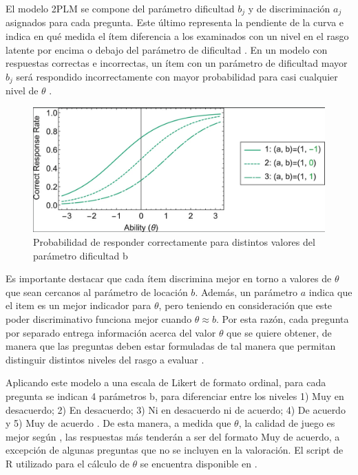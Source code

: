 El modelo 2PLM se compone del parámetro dificultad $b_j$ y de discriminación $a_j$ asignados para cada pregunta. Este último representa la pendiente de la curva e indica en qué medida el ítem diferencia a los examinados con un nivel en el rasgo latente por encima o debajo del parámetro de dificultad \cite{TeoriaRespuestaAlItemPsicologia}. En un modelo con respuestas correctas e incorrectas, un ítem con un parámetro de dificultad mayor $b_j$ será respondido incorrectamente con mayor probabilidad para casi cualquier nivel de $\theta$ \cite{IRTShojima2022}.


\begin{figure}[h]
	\centering
	\includegraphics[scale=.5]{imagenes/IRTparambdifficulty.png}
	\caption{Probabilidad de responder correctamente para distintos valores del parámetro dificultad b}
	\label{ParamDifficulty}
\end{figure}


Es importante destacar que cada ítem discrimina mejor en torno a valores de $\theta$ que sean cercanos al parámetro de locación $b$. Además, un parámetro $a$ indica que el item es un mejor indicador para $\theta$, pero teniendo en consideración que este poder discriminativo funciona mejor cuando $\theta \approx b$. Por esta razón, cada pregunta por separado entrega información acerca del valor $\theta$ que se quiere obtener, de manera que las preguntas deben estar formuladas de tal manera que permitan distinguir distintos niveles del rasgo a evaluar \cite{TeoriaRespuestaAlItemPsicologia}.

Aplicando este modelo a una escala de Likert de formato ordinal, para cada pregunta se indican 4 parámetros b, para diferenciar entre los niveles 1) Muy en desacuerdo; 2) En desacuerdo; 3) Ni en desacuerdo ni de acuerdo; 4) De acuerdo y 5) Muy de acuerdo \cite{TeoriaRespuestaAlItemPsicologia, meegaplusQualityEvaluationPage}. De esta manera, a medida que $\theta$, la calidad de juego es mejor según \cite{meegaplusQualityEvaluationPage}, las respuestas más tenderán a ser del formato Muy de acuerdo, a excepción de algunas preguntas que no se incluyen en la valoración. El script de R utilizado para el cálculo de $\theta$ se encuentra disponible en \cite{meegaplusQualityEvaluationPage}.

